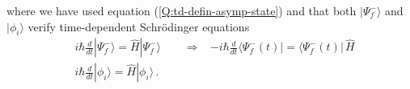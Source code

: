 where we have used equation (\ref{Q:td-defin-asymp-state}) and that both $|\Psi_{f}^{-}\rangle$ and $|\phi_{i}\rangle$ verify time-dependent Schr\"{o}dinger equations
\begin{subequations}
  \begin{align}
    & i \hbar \frac{d}{dt} |\Psi_{f}^{-}\rangle = \hat{H} |\Psi_{f}^{-}\rangle \qquad \Rightarrow & -i \hbar \frac{d }{dt} \langle \Psi^{-}_{f}(t) | = \langle \Psi^{-}_{f}(t) | \, \hat{H}\\
    & i \hbar \frac{d}{dt} |\phi_{i}\rangle = \hat{H} |\phi_{i}\rangle \,.
  \end{align}
\end{subequations}


